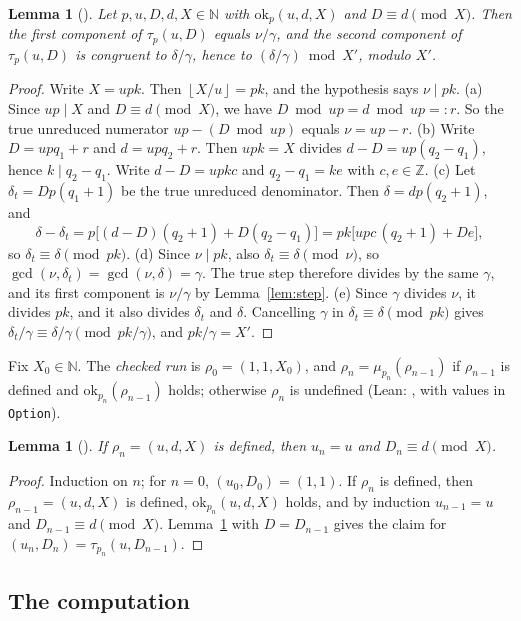\documentclass[11pt]{amsart}
\theoremstyle{plain}
\newtheorem{lemma}[theorem]{Lemma}
\theoremstyle{definition}
\newcommand{\N}{\mathbb{N}}
\newcommand{\Z}{\mathbb{Z}}
\newcommand{\fl}[1]{\left\lfloor #1\right\rfloor}
\begin{document}
\begin{lemma}[]\label{lem:mod}
Let $p,u,D,d,X\in\N$ with $\mathrm{ok}_p(u,d,X)$ and $D\equiv d\pmod X$. Then the first component of $\tau_p(u,D)$ equals $\nu/\gamma$, and the second component of $\tau_p(u,D)$ is congruent to $\delta/\gamma$, hence to $(\delta/\gamma)\bmod X'$, modulo $X'$.
\end{lemma}
\begin{proof}
Write $X=upk$. Then $\fl{X/u}=pk$, and the hypothesis says $\nu\mid pk$.
(a) Since $up\mid X$ and $D\equiv d\pmod X$, we have $D\bmod up=d\bmod up=:r$. So the true unreduced numerator $up-(D\bmod up)$ equals $\nu=up-r$.
(b) Write $D=upq_1+r$ and $d=upq_2+r$. Then $upk=X$ divides $d-D=up(q_2-q_1)$, hence $k\mid q_2-q_1$. Write $d-D=upkc$ and $q_2-q_1=ke$ with $c,e\in\Z$.
(c) Let $\delta_t=Dp(q_1+1)$ be the true unreduced denominator. Then $\delta=dp(q_2+1)$, and
\[
  \delta-\delta_t=p\bigl[(d-D)(q_2+1)+D(q_2-q_1)\bigr]=pk\bigl[upc\,(q_2+1)+De\bigr],
\]
so $\delta_t\equiv\delta\pmod{pk}$.
(d) Since $\nu\mid pk$, also $\delta_t\equiv\delta\pmod\nu$, so $\gcd(\nu,\delta_t)=\gcd(\nu,\delta)=\gamma$. The true step therefore divides by the same $\gamma$, and its first component is $\nu/\gamma$ by Lemma~\ref{lem:step}.
(e) Since $\gamma$ divides $\nu$, it divides $pk$, and it also divides $\delta_t$ and $\delta$. Cancelling $\gamma$ in $\delta_t\equiv\delta\pmod{pk}$ gives $\delta_t/\gamma\equiv\delta/\gamma\pmod{pk/\gamma}$, and $pk/\gamma=X'$.
\end{proof}

Fix $X_0\in\N$. The \emph{checked run} is $\rho_0=(1,1,X_0)$, and $\rho_n=\mu_{p_n}(\rho_{n-1})$ if $\rho_{n-1}$ is defined and $\mathrm{ok}_{p_n}(\rho_{n-1})$ holds; otherwise $\rho_n$ is undefined (Lean: , with values in \texttt{Option}).

\begin{lemma}[]\label{lem:run}
If $\rho_n=(u,d,X)$ is defined, then $u_n=u$ and $D_n\equiv d\pmod X$.
\end{lemma}
\begin{proof}
Induction on $n$; for $n=0$, $(u_0,D_0)=(1,1)$. If $\rho_n$ is defined, then $\rho_{n-1}=(u,d,X)$ is defined, $\mathrm{ok}_{p_n}(u,d,X)$ holds, and by induction $u_{n-1}=u$ and $D_{n-1}\equiv d\pmod X$. Lemma~\ref{lem:mod} with $D=D_{n-1}$ gives the claim for $(u_n,D_n)=\tau_{p_n}(u,D_{n-1})$.
\end{proof}

\subsection{The computation}
\end{document}
